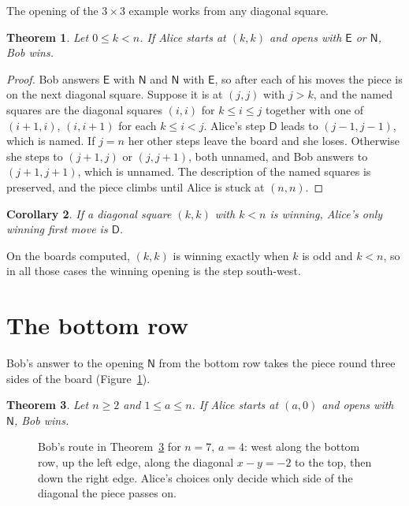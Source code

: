 \documentclass[11pt]{article}
\newtheorem{theorem}{Theorem}
\newtheorem{corollary}[theorem]{Corollary}
\theoremstyle{remark}
\newcommand{\E}{\mathsf{E}}
\newcommand{\N}{\mathsf{N}}
\newcommand{\D}{\mathsf{D}}
\begin{document}
The opening of the $3\times 3$ example works from any diagonal square.

\begin{theorem}\label{thm:diag}
Let $0\le k<n$. If Alice starts at $(k,k)$ and opens with $\E$ or $\N$, Bob wins.
\end{theorem}

\begin{proof}
Bob answers $\E$ with $\N$ and $\N$ with $\E$, so after each of his moves the piece is on the
next diagonal square. Suppose it is at $(j,j)$ with $j>k$, and the named squares are the
diagonal squares $(i,i)$ for $k\le i\le j$ together with one of $(i+1,i)$, $(i,i+1)$ for each
$k\le i<j$. Alice's step $\D$ leads to $(j-1,j-1)$, which is named. If $j=n$ her other steps
leave the board and she loses. Otherwise she steps to $(j+1,j)$ or $(j,j+1)$, both unnamed, and
Bob answers to $(j+1,j+1)$, which is unnamed. The description of the named squares is
preserved, and the piece climbs until Alice is stuck at $(n,n)$.
\end{proof}

\begin{corollary}\label{cor:diag}
If a diagonal square $(k,k)$ with $k<n$ is winning, Alice's only winning first move is $\D$.
\end{corollary}

On the boards computed, $(k,k)$ is winning exactly when $k$ is odd and $k<n$, so in all those
cases the winning opening is the step south-west.

\section{The bottom row}

Bob's answer to the opening $\N$ from the bottom row takes the piece round three sides of the
board (Figure~\ref{fig:strategy}).

\begin{theorem}\label{thm:bottom}
Let $n\ge 2$ and $1\le a\le n$. If Alice starts at $(a,0)$ and opens with $\N$, Bob wins.
\end{theorem}

\begin{figure}[ht]
\centering

\caption{Bob's route in Theorem~\ref{thm:bottom} for $n=7$, $a=4$: west along the bottom row,
up the left edge, along the diagonal $x-y=-2$ to the top, then down the right edge. Alice's
choices only decide which side of the diagonal the piece passes on.}
\label{fig:strategy}
\end{figure}
\end{document}
